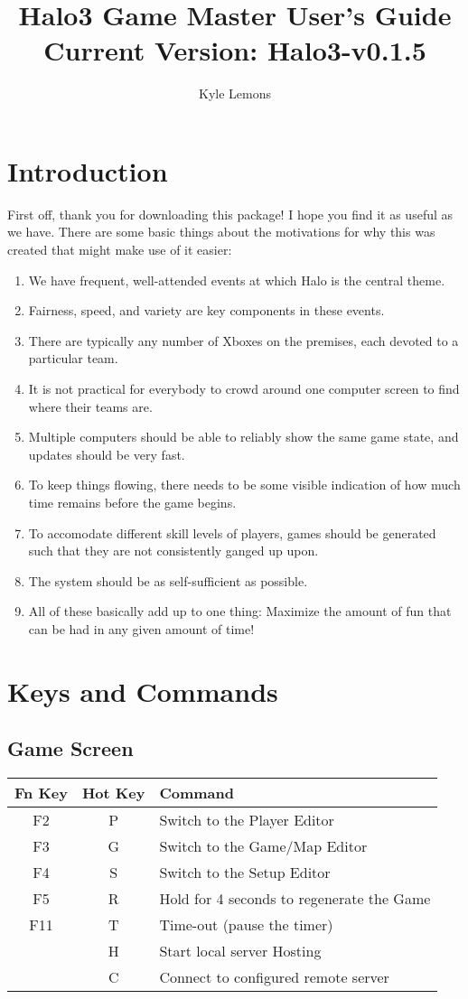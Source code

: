 \documentclass[10pt,a4paper]{report}
\author{Kyle Lemons}
\title{Halo3 Game Master User's Guide \\
{\large{Current Version: Halo3-v0.1.5}}}
\begin{document}
\maketitle
\tableofcontents
\pagebreak

\chapter{Introduction}
First off, thank you for downloading this package!  I hope you find it as useful as we have.
There are some basic things about the motivations for why this was created that might make use of it easier:
\begin{enumerate}
\item We have frequent, well-attended events at which Halo is the central theme.
\item Fairness, speed, and variety are key components in these events.
\item There are typically any number of Xboxes on the premises, each devoted to a particular team.
\item It is not practical for everybody to crowd around one computer screen to find where their teams are.
\item Multiple computers should be able to reliably show the same game state, and updates should be very fast.
\item To keep things flowing, there needs to be some visible indication of how much time remains before the game begins.
\item To accomodate different skill levels of players, games should be generated such that they are not consistently ganged up upon.
\item The system should be as self-sufficient as possible.
\item All of these basically add up to one thing: Maximize the amount of fun that can be had in any given amount of time!
\end{enumerate}

\chapter{Keys and Commands}
\section{Game Screen}
\begin{tabular}{c|c|l}
Fn Key & Hot Key & Command \\
\hline
F2 & P & Switch to the Player Editor \\
F3 & G & Switch to the Game/Map Editor \\
F4 & S & Switch to the Setup Editor \\
F5 & R & Hold for 4 seconds to regenerate the Game \\
F11 & T & Time-out (pause the timer) \\
& H & Start local server Hosting \\
& C & Connect to configured remote server \\
\end{tabular}
\end{document}

